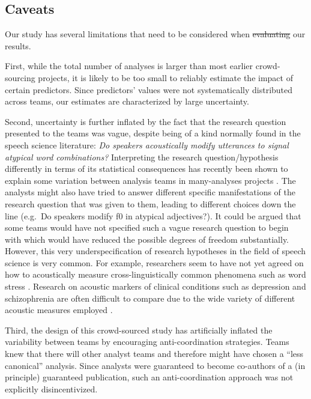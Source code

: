 \documentclass[Review,times,sageh]{sagej}
\providecommand{\DIFaddtex}[1]{{\protect\color{blue}\uwave{#1}}} %
\providecommand{\DIFdeltex}[1]{{\protect\color{red}\sout{#1}}}                      %
\providecommand{\DIFaddbegin}{} %
\providecommand{\DIFaddend}{} %
\providecommand{\DIFdelbegin}{} %
\providecommand{\DIFdelend}{} %
\providecommand{\DIFadd}[1]{\texorpdfstring{\DIFaddtex{#1}}{#1}} %
\providecommand{\DIFdel}[1]{\texorpdfstring{\DIFdeltex{#1}}{}} %
\begin{document}
\hypertarget{caveats}{%
\subsection{Caveats}\label{caveats}}

Our study has several limitations that need to be considered when \DIFdelbegin \DIFdel{evaluating }\DIFdelend \DIFaddbegin \DIFadd{interpreting }\DIFaddend our results.

First, while the total number of analyses is larger than most earlier crowd-sourcing projects, it is likely to be too small to reliably estimate the impact of certain predictors.
Since predictors' values were not systematically distributed across teams, our estimates are characterized by large uncertainty.

Second, uncertainty is further inflated by the fact that the research question presented to the teams was vague, despite being of a kind normally found in the speech science literature: \emph{Do speakers acoustically modify utterances to signal atypical word combinations?}
Interpreting the research question/hypothesis differently in terms of its statistical consequences has recently been shown to explain some variation between analysis teams in many-analyses projects \citep{auspurg2021has}.
The analysts might also have tried to answer different specific manifestations of the research question that was given to them, leading to different choices down the line (e.g.~Do speakers modify f0 in atypical adjectives?).
It could be argued that some teams would have not specified such a vague research question to begin with which would have reduced the possible degrees of freedom substantially.
However, this very underspecification of research hypotheses in the field of speech science \citep[and beyond, see][]{scheel2022most} is very common.
For example, researchers seem to have not yet agreed on how to acoustically measure cross-linguistically common phenomena such as word stress \citep[e.g.][]{gordon2017acoustic}.
Research on acoustic markers of clinical conditions such as depression and schizophrenia are often difficult to compare due to the wide variety of different acoustic measures employed \citep[e.g.][]{cummins2015review, parola2022speech}.

Third, the design of this crowd-sourced study has artificially inflated the variability between teams by encouraging anti-coordination strategies.
Teams knew that there will other analyst teams and therefore might have chosen a ``less canonical'' analysis.
Since analysts were guaranteed to become co-authors of a (in principle) guaranteed publication, such an anti-coordination approach was not explicitly disincentivized.
\end{document}
